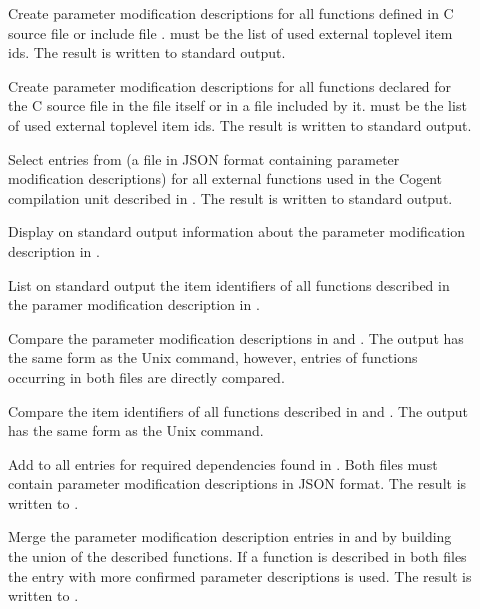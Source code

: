 \begin{description}
\item[] Create parameter modification descriptions for all functions defined in C source file 
or include file .  must be the list of used external toplevel item ids. 
The result is written to standard output.

\item[] Create parameter modification descriptions for all functions declared for the C source file
 in the file itself or in a file included by it.  must be the list of used external toplevel item ids. 
The result is written to standard output.

\item[] Select entries from  (a file in JSON format containing parameter modification
descriptions) for all external functions used in the Cogent compilation unit described in . 
The result is written to standard output.

\item[] Display on standard output information about the parameter modification description in .

\item[] List on standard output the item identifiers of all functions described in the 
paramer modification description in .

\item[] Compare the parameter modification descriptions in  and . The output
has the same form as the Unix  command, however, entries of functions occurring in both files are 
directly compared.

\item[] Compare the item identifiers of all functions described in  and .
The output has the same form as the Unix  command.

\item[] Add to  all entries for required dependencies found in . Both files must contain 
parameter modification descriptions in JSON format. The result is written to .

\item[] Merge the parameter modification description entries in  and  by building 
the union of the described functions. If a function is described in both files the entry with more confirmed parameter 
descriptions is used. The result is written to .


\end{description}
